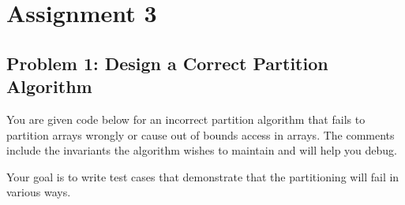 \documentclass[
]{article}
\author{}
\date{}
\begin{document}
\hypertarget{assignment-3}{%
\section{Assignment 3}\label{assignment-3}}

\hypertarget{problem-1-design-a-correct-partition-algorithm}{%
\subsection{Problem 1: Design a Correct Partition
Algorithm}\label{problem-1-design-a-correct-partition-algorithm}}

You are given code below for an incorrect partition algorithm that fails
to partition arrays wrongly or cause out of bounds access in arrays. The
comments include the invariants the algorithm wishes to maintain and
will help you debug.

Your goal is to write test cases that demonstrate that the partitioning
will fail in various ways.
\end{document}
